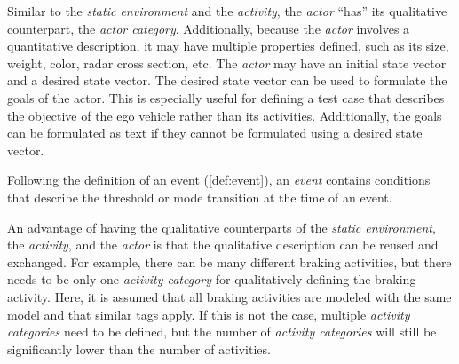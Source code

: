 
Similar to the \textit{static environment} and the \textit{activity}, the \textit{actor} ``has'' its qualitative counterpart, the \textit{actor category}. Additionally, because the \textit{actor} involves a quantitative description, it may have multiple properties defined, such as its size, weight, color, radar cross section, etc. The \textit{actor} may have an initial state \cstart vector \cend and a desired state \cstart vector\cend. The desired state \cstart vector \cend can be used to formulate the goals of the actor. This is especially useful for defining a test case that describes the objective of the ego vehicle rather than its activities. Additionally, the goals can be formulated as text if they cannot be formulated using a desired state \cstart vector\cend.



Following the definition of an event (\cref{def:event}), an \textit{event} contains conditions that describe the threshold or mode transition at the time of an event.


An advantage of having the qualitative counterparts of the \textit{static environment}, the \textit{activity}, and the \textit{actor} is that the qualitative description can be reused and exchanged. For example, there can be many different braking activities, but there needs to be only one \textit{activity category} for qualitatively defining the braking activity. Here, it is assumed that all braking activities are modeled with the same model and that similar tags apply. If this is not the case, multiple \textit{activity categories} need to be defined, but the number of \textit{activity categories} will still be significantly lower than the number of activities.

